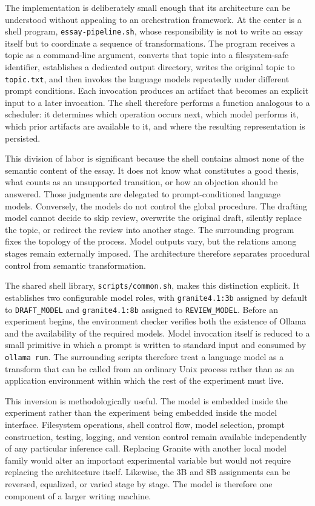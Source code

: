 \documentclass[11pt]{article}
\begin{document}
The implementation is deliberately small enough that its architecture can be understood without appealing to an orchestration framework. At the center is a shell program, \texttt{essay-pipeline.sh}, whose responsibility is not to write an essay itself but to coordinate a sequence of transformations. The program receives a topic as a command-line argument, converts that topic into a filesystem-safe identifier, establishes a dedicated output directory, writes the original topic to \texttt{topic.txt}, and then invokes the language models repeatedly under different prompt conditions. Each invocation produces an artifact that becomes an explicit input to a later invocation. The shell therefore performs a function analogous to a scheduler: it determines which operation occurs next, which model performs it, which prior artifacts are available to it, and where the resulting representation is persisted.

This division of labor is significant because the shell contains almost none of the semantic content of the essay. It does not know what constitutes a good thesis, what counts as an unsupported transition, or how an objection should be answered. Those judgments are delegated to prompt-conditioned language models. Conversely, the models do not control the global procedure. The drafting model cannot decide to skip review, overwrite the original draft, silently replace the topic, or redirect the review into another stage. The surrounding program fixes the topology of the process. Model outputs vary, but the relations among stages remain externally imposed. The architecture therefore separates procedural control from semantic transformation.

The shared shell library, \texttt{scripts/common.sh}, makes this distinction explicit. It establishes two configurable model roles, with \texttt{granite4.1:3b} assigned by default to \texttt{DRAFT\_MODEL} and \texttt{granite4.1:8b} assigned to \texttt{REVIEW\_MODEL}. Before an experiment begins, the environment checker verifies both the existence of Ollama and the availability of the required models. Model invocation itself is reduced to a small primitive in which a prompt is written to standard input and consumed by \texttt{ollama run}. The surrounding scripts therefore treat a language model as a transform that can be called from an ordinary Unix process rather than as an application environment within which the rest of the experiment must live.

This inversion is methodologically useful. The model is embedded inside the experiment rather than the experiment being embedded inside the model interface. Filesystem operations, shell control flow, model selection, prompt construction, testing, logging, and version control remain available independently of any particular inference call. Replacing Granite with another local model family would alter an important experimental variable but would not require replacing the architecture itself. Likewise, the 3B and 8B assignments can be reversed, equalized, or varied stage by stage. The model is therefore one component of a larger writing machine.
\end{document}
